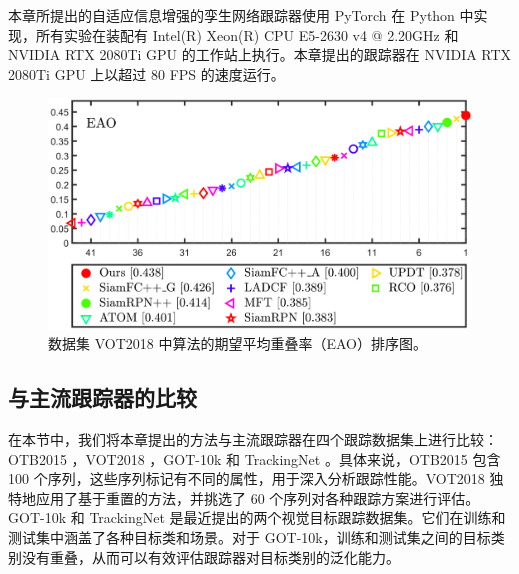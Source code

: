本章所提出的自适应信息增强的孪生网络跟踪器使用 PyTorch 在 Python 中实现，所有实验在装配有 Intel(R) Xeon(R) CPU E5-2630 v4 @ 2.20GHz
和 NVIDIA RTX 2080Ti GPU 的工作站上执行。本章提出的跟踪器在 NVIDIA RTX 2080Ti GPU 上以超过 80 FPS 的速度运行。

\begin{figure}[t]
    \centering
    \includegraphics[width=1.0\textwidth]{Img/MTP/vot18/vot18_eao.png}
    \caption{数据集 VOT2018 中算法的期望平均重叠率（EAO）排序图。}
    \label{fig:eao}
\end{figure}


\subsection{与主流跟踪器的比较}

在本节中，我们将本章提出的方法与主流跟踪器在四个跟踪数据集上进行比较：OTB2015 \cite{OTB2015}，VOT2018 \cite{kristan2018sixth}，GOT-10k \cite{GOT-10k} 和 TrackingNet \cite{muller2018trackingnet}。具体来说，OTB2015 \cite{OTB2015} 包含 100 个序列，这些序列标记有不同的属性，用于深入分析跟踪性能。VOT2018 \cite{kristan2018sixth} 独特地应用了基于重置的方法，并挑选了 60 个序列对各种跟踪方案进行评估。GOT-10k \cite{GOT-10k} 和 TrackingNet \cite{muller2018trackingnet} 是最近提出的两个视觉目标跟踪数据集。它们在训练和测试集中涵盖了各种目标类和场景。对于 GOT-10k，训练和测试集之间的目标类别没有重叠，从而可以有效评估跟踪器对目标类别的泛化能力。


